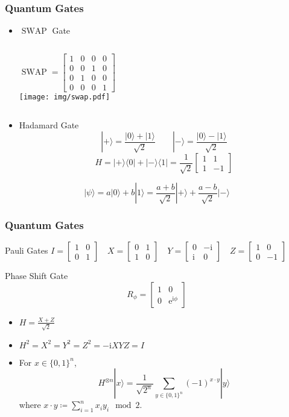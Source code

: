 \documentclass[UTF8,11pt,colorlinks,compress,openany]{beamer}%
\begin{document}
\begin{frame}\frametitle{Quantum Gates}
	\begin{itemize}
		\item $\operatorname{SWAP}$ Gate
		\begin{columns}
		\[\operatorname{SWAP} = \begin{bmatrix} 1&0&0&0\\0&0&1&0\\0&1&0&0\\0&0&0&1\end{bmatrix}\]
		\texttt{[image: img/swap.pdf]}
		\end{columns}
		\item Hadamard Gate
		\[|+\rangle=\frac{|0\rangle +|1\rangle}{\sqrt{2}}\qquad |-\rangle=\frac{|0\rangle -|1\rangle}{\sqrt{2}}\]
		\[H=|+\rangle\langle 0|+|-\rangle\langle 1| = \frac{1}{\sqrt{2}} \begin{bmatrix} 1 & 1 \\ 1 & -1 \end{bmatrix}\]
	\end{itemize}
	\[|\psi\rangle=a|0\rangle+b|1\rangle=\frac{a+b}{\sqrt{2}}|+\rangle+\frac{a-b}{\sqrt{2}}|-\rangle\]
\end{frame}

\begin{frame}\frametitle{Quantum Gates}
\setlength\abovedisplayskip{0pt}
\setlength\belowdisplayskip{0pt}
\begin{block}{Pauli Gates}
$I = \begin{bmatrix} 1 & 0 \\ 0 & 1\end{bmatrix}\quad
X = \begin{bmatrix} 0 & 1 \\ 1 & 0\end{bmatrix}\quad
Y = \begin{bmatrix} 0 & -\mathrm{i} \\ \mathrm{i} & 0\end{bmatrix}\quad
Z = \begin{bmatrix} 1 & 0 \\ 0 & -1\end{bmatrix}$
\end{block}
\begin{block}{Phase Shift Gate}
	\[R_{\phi}=
	\begin{bmatrix}
	1&0\\
	0&\mathrm{e}^{\mathrm{i}\phi}
	\end{bmatrix}\]
\end{block}
\begin{itemize}
	\item $H=\frac{X+Z}{\sqrt{2}}$
	\item $H^2=X^2=Y^2=Z^2=-\mathrm{i}XYZ=I$
	\item For $x\in\{0,1\}^n$,
\[H^{\otimes n}|x\rangle=\frac{1}{\sqrt{2^n}}\sum\limits_{y\in\{0,1\}^n}(-1)^{x\cdot y}|y\rangle\]
where $x\cdot y\coloneqq \sum\limits_{i=1}^n x_iy_i\mod 2$.
\end{itemize}
\end{frame}
\end{document}
